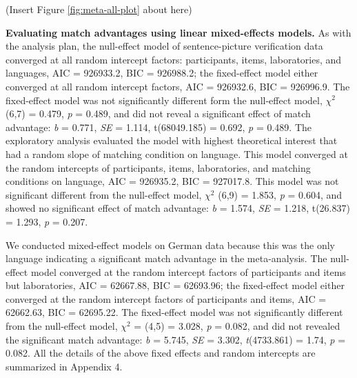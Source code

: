 \documentclass[
  man]{apa7}
\begin{document}
(Insert Figure \ref{fig:meta-all-plot} about here)

\textbf{Evaluating match advantages using linear mixed-effects models.} As with the analysis plan, the null-effect model of sentence-picture verification data converged at all random intercept factors: participants, items, laboratories, and languages, AIC = 926933.2, BIC = 926988.2; the fixed-effect model either converged at all random intercept factors, AIC = 926932.6, BIC = 926996.9. The fixed-effect model was not significantly different form the null-effect model, \({\chi}^2\) (6,7) = 0.479, \emph{p} = 0.489, and did not reveal a significant effect of match advantage: \emph{b} = 0.771, \emph{SE} = 1.114, t(68049.185) = 0.692, \emph{p} = 0.489. The exploratory analysis evaluated the model with highest theoretical interest that had a random slope of matching condition on language. This model converged at the random intercepts of participants, items, laboratories, and matching conditions on language, AIC = 926935.2, BIC = 927017.8. This model was not significant different from the null-effect model, \({\chi}^2\) (6,9) = 1.853, \emph{p} = 0.604, and showed no significant effect of match advantage: \emph{b} = 1.574, \emph{SE} = 1.218, t(26.837) = 1.293, \emph{p} = 0.207.

We conducted mixed-effect models on German data because this was the only language indicating a significant match advantage in the meta-analysis. The null-effect model converged at the random intercept factors of participants and items but laboratories, AIC = 62667.88, BIC = 62693.96; the fixed-effect model either converged at the random intercept factors of participants and items, AIC = 62662.63, BIC = 62695.22. The fixed-effect model was not significantly different from the null-effect model, \({\chi}^2\) = (4,5) = 3.028, \emph{p} = 0.082, and did not revealed the significant match advantage: \emph{b} = 5.745, \emph{SE} = 3.302, \emph{t}(4733.861) = 1.74, \emph{p} = 0.082. All the details of the above fixed effects and random intercepts are summarized in Appendix 4.
\end{document}
